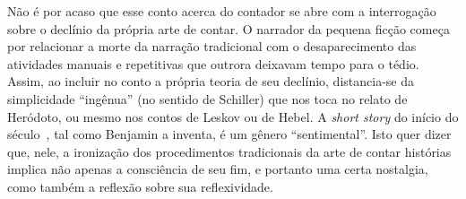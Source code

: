 Não é por acaso que esse conto acerca do contador se abre com a
interrogação sobre o declínio da própria arte de contar. O narrador da
pequena ficção começa por relacionar a morte da narração tradicional com
o desaparecimento das atividades manuais e repetitivas que outrora
deixavam tempo para o tédio. Assim, ao incluir no conto a própria teoria
de seu declínio, distancia-se da simplicidade ``ingênua'' (no sentido de
Schiller) que nos toca no relato de Heródoto, ou mesmo nos contos de
Leskov ou de Hebel. A \emph{short story} do início do século~, tal
como Benjamin a inventa, é um gênero ``sentimental''. Isto quer dizer
que, nele, a ironização dos procedimentos tradicionais da arte de contar
histórias implica não apenas a consciência de seu fim, e portanto uma
certa nostalgia, como também a reflexão sobre sua reflexividade.
